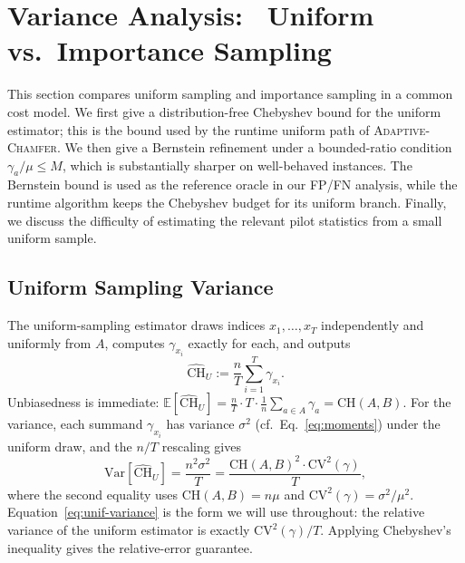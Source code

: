 \documentclass[conference]{IEEEtran}
\begin{document}
\section{Variance Analysis: \ Uniform vs.\ Importance Sampling}
\label{sec:theory}

This section compares uniform sampling and importance sampling in a
common cost model. We first give a distribution-free Chebyshev bound
for the uniform estimator; this is the bound used by the runtime
uniform path of \textsc{Adaptive-Chamfer}. We then give a Bernstein
refinement under a bounded-ratio condition
$\gamma_a/\mu \leq M$, which is substantially sharper on well-behaved
instances. The Bernstein bound is used as the reference oracle in our
FP/FN analysis, while the runtime algorithm keeps the Chebyshev budget
for its uniform branch. Finally, we discuss the difficulty of estimating
the relevant pilot statistics from a small uniform sample.

\subsection{Uniform Sampling Variance}
\label{sec:unif-variance}

The uniform-sampling estimator draws indices
$x_1, \dots, x_T$ independently and uniformly from $A$, computes
$\gamma_{x_i}$ exactly for each, and outputs
\begin{equation}
    \widehat{\mathrm{CH}}_U
    := \frac{n}{T} \sum_{i=1}^{T} \gamma_{x_i}.
\label{eq:unif-est}
\end{equation}
Unbiasedness is immediate:
$\mathbb{E}[\widehat{\mathrm{CH}}_U]
= \frac{n}{T} \cdot T \cdot \frac{1}{n} \sum_{a \in A} \gamma_a
= \mathrm{CH}(A, B)$. For the variance, each summand $\gamma_{x_i}$
has variance $\sigma^2$ (cf.~Eq.~\ref{eq:moments}) under the uniform
draw, and the $n/T$ rescaling gives
\begin{equation}
    \mathrm{Var}\!\left[\widehat{\mathrm{CH}}_U\right]
    = \frac{n^2 \sigma^2}{T}
    = \frac{\mathrm{CH}(A, B)^2 \cdot \mathrm{CV}^2(\gamma)}{T},
\label{eq:unif-variance}
\end{equation}
where the second equality uses
$\mathrm{CH}(A, B) = n \mu$ and
$\mathrm{CV}^2(\gamma) = \sigma^2 / \mu^2$. Equation~\ref{eq:unif-variance}
is the form we will use throughout: the relative variance of the
uniform estimator is exactly $\mathrm{CV}^2(\gamma) / T$. Applying
Chebyshev's inequality gives the relative-error guarantee.
\end{document}

